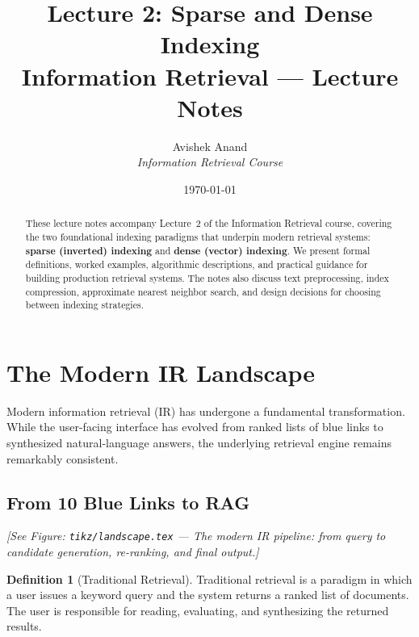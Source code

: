 \documentclass[aspectratio=169]{beamer} \usetheme{TUDelft} %
\title{%
  \textbf{Lecture 2: Sparse and Dense Indexing} \\[0.5em]
  \Large Information Retrieval --- Lecture Notes
}
\author{Avishek Anand \\ \textit{Information Retrieval Course}}
\date{\today}
\theoremstyle{definition}
\newtheorem{definition}{Definition}[section]
\theoremstyle{plain}
\begin{document}
\maketitle

\begin{abstract}
These lecture notes accompany Lecture~2 of the Information Retrieval course, covering the two foundational indexing paradigms that underpin modern retrieval systems: \textbf{sparse (inverted) indexing} and \textbf{dense (vector) indexing}. We present formal definitions, worked examples, algorithmic descriptions, and practical guidance for building production retrieval systems. The notes also discuss text preprocessing, index compression, approximate nearest neighbor search, and design decisions for choosing between indexing strategies.
\end{abstract}

\tableofcontents
\newpage

\section{The Modern IR Landscape}
\label{sec:landscape}

Modern information retrieval (IR) has undergone a fundamental transformation. While the user-facing interface has evolved from ranked lists of blue links to synthesized natural-language answers, the underlying retrieval engine remains remarkably consistent.

\subsection{From 10 Blue Links to RAG}

\begin{center}
\textit{[See Figure: \texttt{tikz/landscape.tex} --- The modern IR pipeline: from query to candidate generation, re-ranking, and final output.]}
\end{center}

\begin{definition}[Traditional Retrieval]
\label{def:traditional-retrieval}
Traditional retrieval is a paradigm in which a user issues a keyword query and the system returns a ranked list of documents. The user is responsible for reading, evaluating, and synthesizing the returned results.
\end{definition}
\end{document}

